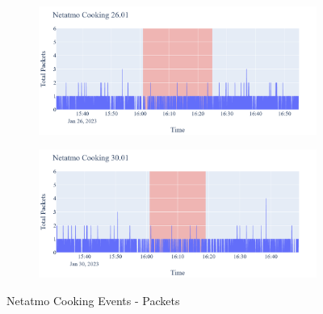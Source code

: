 \begin{figure}[H]
\begin{subfigure}[b]{0.5\textwidth}
    \end{subfigure}
    \begin{subfigure}[b]{0.5\textwidth}
        \centering
        \includegraphics[width=1.2\hsize]{figures/Netatmo_Cooking_Packets_26.01.png}
    \end{subfigure}
    \begin{subfigure}[b]{0.5\textwidth}
        \centering
        \includegraphics[width=1.2\hsize]{figures/Netatmo_Cooking_Packets_30.01.png}
    \end{subfigure}
    \caption{Netatmo Cooking Events - Packets}
    \label{fig:NetatmoCookingPackets}
\end{figure}

